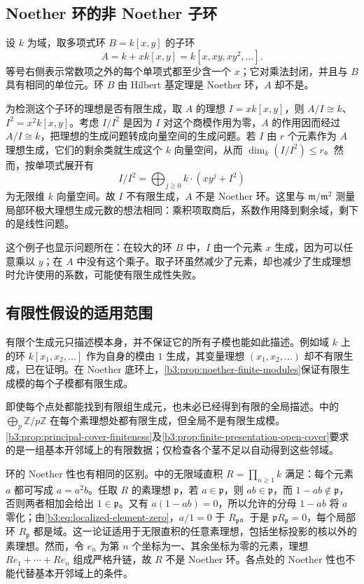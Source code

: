 \subsection{Noether 环的非 Noether 子环}
\label{b3:subsec:0304:02}

设 \(k\) 为域，取多项式环 \(B=k[x,y]\) 的子环
\[
	A=k+xk[x,y] =k[x,xy,xy^2,\ldots].
\]
等号右侧表示常数项之外的每个单项式都至少含一个 \(x\)；它对乘法封闭，并且与 \(B\) 具有相同的单位元。环 \(B\) 由 Hilbert 基定理是 Noether 环，\(A\) 却不是。

\ProseParagraphBreak
为检测这个子环的理想是否有限生成，取 \(A\) 的理想 \(I=xk[x,y]\)，则 \(A/I\cong k\)、\(I^2=x^2k[x,y]\)。考虑 \(I/I^2\) 是因为 \(I\) 对这个商模作用为零，\(A\) 的作用因而经过 \(A/I\cong k\)，把理想的生成问题转成向量空间的生成问题。若 \(I\) 由 \(r\) 个元素作为 \(A\) 理想生成，它们的剩余类就生成这个 \(k\) 向量空间，从而 \(\dim_k(I/I^2)\le r\)。然而，按单项式展开有
\[
	I/I^2 =\bigoplus_{j\ge0}k\cdot(xy^j+I^2)
\]
为无限维 \(k\) 向量空间。故 \(I\) 不有限生成，\(A\) 不是 Noether 环。这里与 \(\mathfrak m/\mathfrak m^2\) 测量局部环极大理想生成元数的想法相同：乘积项取商后，系数作用降到剩余域，剩下的是线性问题。

\ProseParagraphBreak
这个例子也显示问题所在：在较大的环 \(B\) 中，\(I\) 由一个元素 \(x\) 生成，因为可以任意乘以 \(y\)；在 \(A\) 中没有这个乘子。取子环虽然减少了元素，却也减少了生成理想时允许使用的系数，可能使有限生成性失败。

\subsection{有限性假设的适用范围}
\label{b3:subsec:0304:03}

有限个生成元只描述模本身，并不保证它的所有子模也能如此描述。例如域 \(k\) 上的环 \(k[x_1,x_2,\ldots]\) 作为自身的模由 \(1\) 生成，其变量理想 \((x_1,x_2,\ldots)\) 却不有限生成，已在证明。在 Noether 底环上，\cref{b3:prop:noether-finite-modules}保证有限生成模的每个子模都有限生成。

\ProseParagraphBreak
即使每个点处都能找到有限组生成元，也未必已经得到有限的全局描述。中的 \(\bigoplus_p\mathbb Z/p\mathbb Z\) 在每个素理想处都有限生成，但全局不是有限生成模。\cref{b3:prop:principal-cover-finiteness}及\cref{b3:prop:finite-presentation-open-cover}要求的是一组基本开邻域上的有限数据；仅检查各个茎不足以自动得到这些邻域。

\ProseParagraphBreak
环的 Noether 性也有相同的区别。中的无限域直积 \(R=\prod_{n\ge1}k\) 满足：每个元素 \(a\) 都可写成 \(a=a^2b\)。任取 \(R\) 的素理想 \(\mathfrak p\)，若 \(a\in\mathfrak p\)，则 \(ab\in\mathfrak p\)，而 \(1-ab\notin\mathfrak p\)，否则两者相加会给出 \(1\in\mathfrak p\)。又有 \(a(1-ab)=0\)，所以允许的分母 \(1-ab\) 将 \(a\) 零化；由\eqref{b3:eq:localized-element-zero}，\(a/1=0\) 于 \(R_{\mathfrak p}\)。于是 \(\mathfrak pR_{\mathfrak p}=0\)，每个局部环 \(R_{\mathfrak p}\) 都是域。这一论证适用于无限直积的任意素理想，包括坐标投影的核以外的素理想。然而，令 \(e_n\) 为第 \(n\) 个坐标为一、其余坐标为零的元素，理想 \(Re_1+\cdots+Re_n\) 组成严格升链，故 \(R\) 不是 Noether 环。各点处的 Noether 性也不能代替基本开邻域上的条件。

